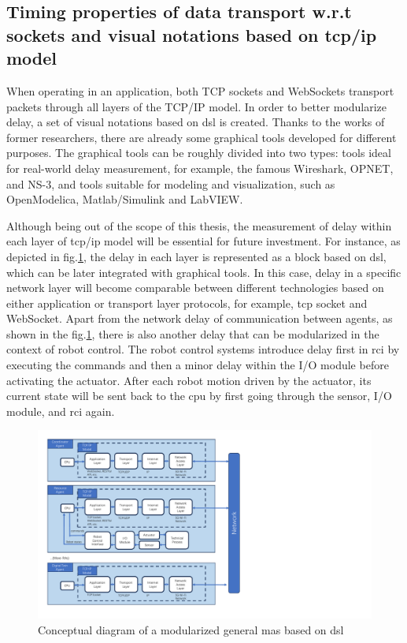 \subsection{Timing properties of data transport w.r.t sockets and visual notations based on \gls{tcp/ip} model}
When operating in an application, both TCP sockets and WebSockets transport packets 
through all layers of the TCP/IP model. In order to better modularize delay, a set of 
visual notations based on \gls{dsl} is created.
Thanks to the works of former researchers, there are already some graphical tools 
developed for different purposes. The graphical tools 
can be roughly divided into two types: tools ideal for real-world delay measurement, 
for example, the famous Wireshark, OPNET, and NS-3, 
and tools suitable for modeling and visualization, such as OpenModelica, 
Matlab/Simulink and LabVIEW.



Although being out of the scope of this thesis, the measurement of delay within 
each layer of \gls{tcp/ip} model will be essential for future investment.
For instance, as depicted in fig.\ref{fig: DSLConceptual}, the delay in 
each layer is represented as a block based on \gls{dsl}, which can be later integrated 
with graphical tools.
In this case, delay in a specific network layer will become comparable between different 
technologies based on either application or transport layer protocols, for example, 
\gls{tcp} socket and WebSocket. Apart from the network delay of communication between 
agents, as shown in the fig.\ref{fig: DSLConceptual}, there is also another delay that can be modularized in 
the context of robot control. The robot control systems introduce delay first in \gls{rci} 
by executing the commands and then a minor delay within the I/O module before activating 
the actuator.
After each robot motion driven by the actuator, its current state will be sent back to 
the \gls{cpu} by first going through the sensor, I/O module, and \gls{rci} again. 







\begin{figure}[htb]
    \includegraphics[width=\textwidth]{figures/DSLConceptual.pdf}
    
    \centering
    \caption{Conceptual diagram of a modularized general \gls{mas} based on \gls{dsl} \label{fig: DSLConceptual}}
\end{figure}
